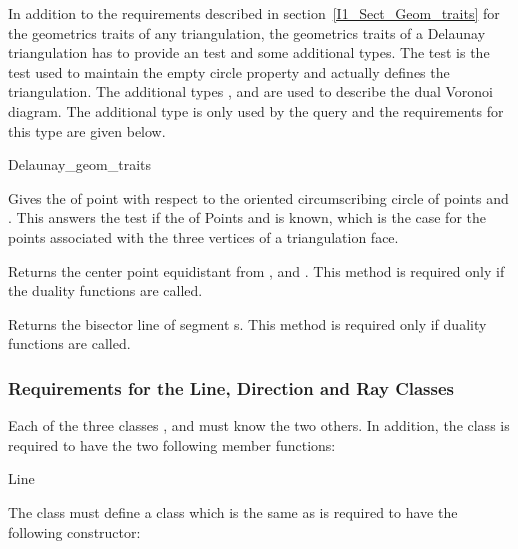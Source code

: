 In addition to the requirements described in section~\ref{I1_Sect_Geom_traits}
for the geometrics traits of any triangulation,
the geometrics traits of a Delaunay triangulation
has to  provide an  test
and some additional types.
The  test is the test used to maintain the
empty circle property and actually defines the triangulation.
The additional types , 
and  are used to describe the dual Voronoi diagram.
The additional  type is only used by the
 query and the requirements for this type
are given below.
\begin{ccClass}{Delaunay_geom_traits}

\ccTypes
{}
\ccThreeToTwo
{}
\ccGlue
{}
\ccGlue
{}

\ccOperations
{}
{Gives the  of point  with respect to
the oriented circumscribing circle of  points  and .
This answers the   test if the 
of  Points  and  is known,
which is the case for the points associated with the three
vertices of a triangulation face.} 

 { Returns the center point equidistant from ,  and
. This method is required only if the duality functions are called.}

{Returns the bisector line of segment s. This method is required only if duality functions
are called.}

\end{ccClass}

\subsubsection{Requirements for the Line, Direction and Ray Classes}

Each of the three classes ,  and 
  must know the two others.
In addition, the  class is required to have the two
following member functions:
\begin{ccClass}{Line}

\ccGlue
{}
\end{ccClass}
The  class must define a  class which is the same
as  
is required to have the following constructor:

